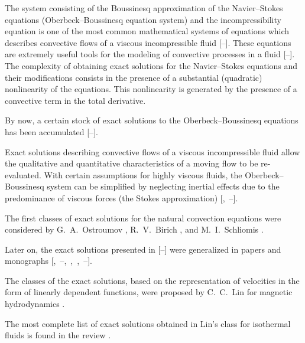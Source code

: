 
The system consisting of the Boussinesq approximation of the Navier--Stokes equations (Oberbeck--Boussinesq equation system) and the incom\-pressibility equation is one of the most common mathematical systems of equations which describes convective flows of a viscous incompressible fluid [--]. These equations are extremely useful tools for the modeling of convective processes in a fluid [--]. The complexity of obtaining exact solutions for the Navier--Stokes equations and their modifications consists in the presence of a substantial (quadratic) nonlinearity of the equations. This nonlinearity is generated by the presence of a convective term in the total derivative.



By now, a certain stock of exact solutions to the Oberbeck--Boussinesq equations has been accumulated [--]. 

Exact solutions describing convective flows of a viscous incompressible fluid allow the qualitative and quantitative characteristics of a moving flow to be re-evaluated. With certain assumptions for highly viscous fluids, the Oberbeck--Boussinesq system can be simplified by neglecting inertial effects due to the predominance of viscous forces (the Stokes approximation) [,~--].



The first classes of exact solutions for the natural convection equations were considered by G.~A.~Ostroumov \cite{ulg:bib:Ostroumov}, R.~V.~Birich \cite{ulg:bib:Birikh}, and M.~I.~Schliomis \cite{ulg:bib:Shliomis}. 

Later on, the exact solutions presented in [--] were generalized in papers and monographs [,~--,~,~,~--].



The classes of the exact solutions, based on the representation of velocities in the form of linearly dependent functions, were proposed by C.~C.~Lin for magnetic hydrodynamics \cite{ulg:bib:Lin}. 

The most complete list of exact solutions obtained in Lin's class for isothermal fluids is found in the review \cite{ulg:bib:Aristov10}.



